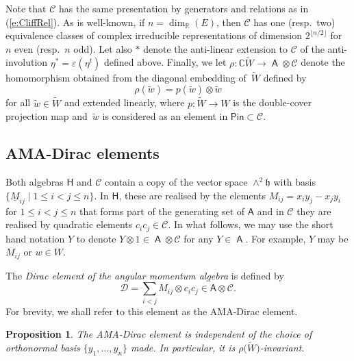\documentclass[10pt,a4paper]{amsart}
\numberwithin{equation}{section}
\newtheorem{Proposition}[Theorem]{Proposition}
 { \theoremstyle{definition}
\newtheorem{Definition}[Theorem]{Definition}
\newtheorem{Note}[Theorem]{Note}
\newtheorem{Example}[Theorem]{Example}
\newtheorem{Remark}[Theorem]{Remark} }
\newcommand{\fh}{\mathfrak{h}}
\newcommand{\bbc}{\mathbb{C}}
\newcommand{\bbr}{\mathbb{R}}
\newcommand{\Cc}{\mathcal{C}}
\newcommand{\uM}{\underline{M}}
\newcommand{\Pin}{\mathsf{Pin}}
\DeclareMathOperator{\ama}{\mathsf{A}}
\begin{document}
Note that $\mathcal{C}$ has the same presentation by generators and relations as in (\ref{e:CliffRel}). As is well-known, if $n=\dim_\bbr(E)$, then $\mathcal{C}$ has one (resp.\ two) equivalence classes of complex irreducible representations of dimension $2^{\lfloor n/2 \rfloor}$ for $n$ even (resp.~$n$ odd). Let also $\ast$ denote the anti-linear extension to $\Cc$ of the anti-involution $\eta^\ast = \varepsilon(\eta^t)$ defined above.
 Finally, we let $\rho\colon \bbc\tilde W\to \ama\otimes\mathcal{C}$ denote the homomorphism obtained from the diagonal embedding of~$\tilde W$ defined by
\begin{equation}\label{ed:rhodef}
\rho(\tilde w) = p(\tilde w)\otimes \tilde w
\end{equation}
 for all $\tilde w\in\tilde W$ and extended linearly, where $p\colon \tilde W\to W$ is the double-cover projection map and~$\tilde{w}$ is considered as an element in $\Pin \subset \Cc$.

\subsection{AMA-Dirac elements}
Both algebras $\mathsf{H}$ and $\mathcal{C}$
contain a copy of the vector space $\wedge^2\fh$ with basis
$\{\uM_{ij}\mid 1\leq i<j \leq n\}$. In $\mathsf{H}$, these are realised by the elements $M_{ij} = x_iy_j-x_jy_i$ for $1\leq i<j \leq n$ that forms part of the generating set of $\mathsf{A}$ and in $\mathcal{C}$ they are realised by quadratic elements $c_ic_j\in\mathcal{C}$. In what follows, we may use the short hand notation $Y$ to denote $Y \otimes 1 \in \ama \otimes \Cc$ for any $Y \in \ama$. For example, $Y$ may be $M_{ij}$ or $w \in W$.

\begin{Definition}
The {\it Dirac element of the angular momentum algebra} is defined by
\begin{equation*}
 \mathcal{D} = \sum_{i<j} M_{ij}\otimes c_ic_j \in \mathsf{A}\otimes \mathcal{C}.
\end{equation*}
For brevity, we shall refer to this element as the AMA-Dirac element.
\end{Definition}

\begin{Proposition}
The AMA-Dirac element is independent of the choice of orthonormal basis $\{y_1,\dots,y_n\}$ made. In particular, it is $\rho\big(\tilde W\big)$-invariant.
\end{Proposition}
\end{document}
